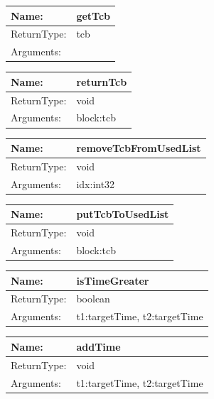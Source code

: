 \begin{tabular}[ht]{|l|l|}
\hline		
	Name: & getTcb\\
	\hline
	ReturnType: &  tcb\\
	\hline
	Arguments: & \\
	\hline
\end{tabular}
\newline\newline\newline
\begin{tabular}[ht]{|l|l|}
\hline		
	Name: & returnTcb\\
	\hline
	ReturnType: &  void\\
	\hline
	Arguments: & block:tcb\\
	\hline
\end{tabular}
\newline\newline\newline
\begin{tabular}[ht]{|l|l|}
\hline		
	Name: & removeTcbFromUsedList\\
	\hline
	ReturnType: &  void\\
	\hline
	Arguments: & idx:int32\\
	\hline
\end{tabular}
\newline\newline\newline
\begin{tabular}[ht]{|l|l|}
\hline		
	Name: & putTcbToUsedList\\
	\hline
	ReturnType: &  void\\
	\hline
	Arguments: & block:tcb\\
	\hline
\end{tabular}
\newline\newline\newline
\begin{tabular}[ht]{|l|l|}
\hline		
	Name: & isTimeGreater\\
	\hline
	ReturnType: &  boolean\\
	\hline
	Arguments: & t1:targetTime, t2:targetTime\\
	\hline
\end{tabular}
\newline\newline\newline
\begin{tabular}[ht]{|l|l|}
\hline		
	Name: & addTime\\
	\hline
	ReturnType: &  void\\
	\hline
	Arguments: & t1:targetTime, t2:targetTime\\
	\hline
\end{tabular}
\newline\newline\newline
